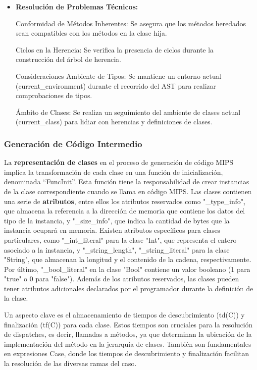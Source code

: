 \documentclass[10pt]{article} %
\begin{document}
\begin{itemize}
	\item \textbf{Resolución de Problemas Técnicos:}
	
	Conformidad de Métodos Inherentes: Se asegura que los métodos heredados sean compatibles con los métodos en la clase hija.
	
	Ciclos en la Herencia: Se verifica la presencia de ciclos durante la construcción del árbol de herencia.
	
	Consideraciones
	Ambiente de Tipos: Se mantiene un entorno actual (current\_environment) durante el recorrido del AST para realizar comprobaciones de tipos.
	
	Ámbito de Clases: Se realiza un seguimiento del ambiente de clases actual (current\_class) para lidiar con herencias y definiciones de clases.
	
	\end{itemize}
	
	\subsubsection{Generaci\'on de C\'odigo Intermedio}
	
	La \textbf{representación de clases} en el proceso de generación de código MIPS implica la transformación de cada clase en una función de inicialización, denominada ``FuncInit''. Esta función tiene la responsabilidad de crear instancias de la clase correspondiente cuando se llama en código MIPS. Las clases contienen una serie de \textbf{atributos}, entre ellos los atributos reservados como "\_type\_info", que almacena la referencia a la dirección de memoria que contiene los datos del tipo de la instancia, y "\_size\_info", que indica la cantidad de bytes que la instancia ocupará en memoria. Existen atributos específicos para clases particulares, como "\_int\_literal" para la clase "Int", que representa el entero asociado a la instancia, y "\_string\_length", "\_string\_literal" para la clase "String", que almacenan la longitud y el contenido de la cadena, respectivamente. Por último, "\_bool\_literal" en la clase "Bool" contiene un valor booleano (1 para "true" o 0 para "false"). Además de los atributos reservados, las clases pueden tener atributos adicionales declarados por el programador durante la definición de la clase.
	
	Un aspecto clave es el almacenamiento de tiempos de descubrimiento (td(C)) y finalización (tf(C)) para cada clase. Estos tiempos son cruciales para la resolución de dispatches, es decir, llamadas a métodos, ya que determinan la ubicación de la implementación del método en la jerarquía de clases. También son fundamentales en expresiones Case, donde los tiempos de descubrimiento y finalización facilitan la resolución de las diversas ramas del caso. 
	
\end{document}
